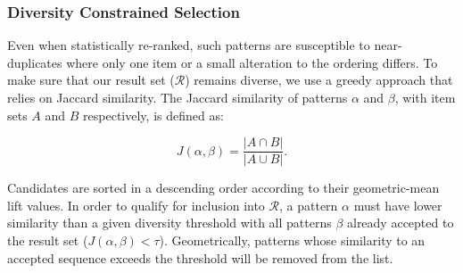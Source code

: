 \subsubsection*{Diversity Constrained Selection}

Even when statistically re-ranked, such patterns are susceptible to near-duplicates where only one item or a small alteration to the ordering differs. To make sure that our result set ($\mathcal{R}$) remains diverse, we use a greedy approach that relies on Jaccard similarity. The Jaccard similarity of patterns $\alpha$ and $\beta$, with item sets $A$ and $B$ respectively, is defined as:

\begin{equation}
    J(\alpha, \beta) = \frac{|A \cap B|}{|A \cup B|}.
    \label{eq:jaccard}
\end{equation}

Candidates are sorted in a descending order according to their geometric-mean lift values. In order to qualify for inclusion into $\mathcal{R}$, a pattern $\alpha$ must have lower similarity than a given diversity threshold with all patterns $\beta$ already accepted to the result set ($J(\alpha, \beta) < \tau$). Geometrically, patterns whose similarity to an accepted sequence exceeds the threshold will be removed from the list.

